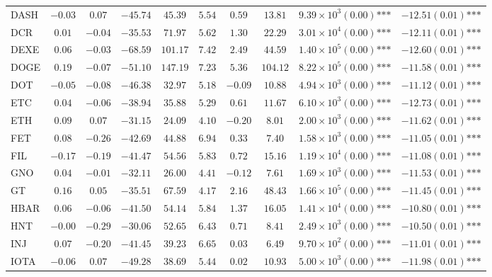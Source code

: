 \documentclass{article}
\begin{document}
\begin{table}[htbp]
\begin{adjustbox}{width=\textwidth}
\begin{tabular}{lccccccccc}
DASH & $-0.03$ & $0.07$ & $-45.74$ & $45.39$ & $5.54$ & $0.59$ & $13.81$ & $9.39\times 10^{3}(0.00)\text{***}$ & $-12.51(0.01)\text{***}$ \\
DCR & $0.01$ & $-0.04$ & $-35.53$ & $71.97$ & $5.62$ & $1.30$ & $22.29$ & $3.01\times 10^{4}(0.00)\text{***}$ & $-12.11(0.01)\text{***}$ \\
DEXE & $0.06$ & $-0.03$ & $-68.59$ & $101.17$ & $7.42$ & $2.49$ & $44.59$ & $1.40\times 10^{5}(0.00)\text{***}$ & $-12.60(0.01)\text{***}$ \\
DOGE & $0.19$ & $-0.07$ & $-51.10$ & $147.19$ & $7.23$ & $5.36$ & $104.12$ & $8.22\times 10^{5}(0.00)\text{***}$ & $-11.58(0.01)\text{***}$ \\
DOT & $-0.05$ & $-0.08$ & $-46.38$ & $32.97$ & $5.18$ & $-0.09$ & $10.88$ & $4.94\times 10^{3}(0.00)\text{***}$ & $-11.12(0.01)\text{***}$ \\
ETC & $0.04$ & $-0.06$ & $-38.94$ & $35.88$ & $5.29$ & $0.61$ & $11.67$ & $6.10\times 10^{3}(0.00)\text{***}$ & $-12.73(0.01)\text{***}$ \\
ETH & $0.09$ & $0.07$ & $-31.15$ & $24.09$ & $4.10$ & $-0.20$ & $8.01$ & $2.00\times 10^{3}(0.00)\text{***}$ & $-11.62(0.01)\text{***}$ \\
FET & $0.08$ & $-0.26$ & $-42.69$ & $44.88$ & $6.94$ & $0.33$ & $7.40$ & $1.58\times 10^{3}(0.00)\text{***}$ & $-11.05(0.01)\text{***}$ \\
FIL & $-0.17$ & $-0.19$ & $-41.47$ & $54.56$ & $5.83$ & $0.72$ & $15.16$ & $1.19\times 10^{4}(0.00)\text{***}$ & $-11.08(0.01)\text{***}$ \\
GNO & $0.04$ & $-0.01$ & $-32.11$ & $26.00$ & $4.41$ & $-0.12$ & $7.61$ & $1.69\times 10^{3}(0.00)\text{***}$ & $-11.53(0.01)\text{***}$ \\
GT & $0.16$ & $0.05$ & $-35.51$ & $67.59$ & $4.17$ & $2.16$ & $48.43$ & $1.66\times 10^{5}(0.00)\text{***}$ & $-11.45(0.01)\text{***}$ \\
HBAR & $0.06$ & $-0.06$ & $-41.50$ & $54.14$ & $5.84$ & $1.37$ & $16.05$ & $1.41\times 10^{4}(0.00)\text{***}$ & $-10.80(0.01)\text{***}$ \\
HNT & $-0.00$ & $-0.29$ & $-30.06$ & $52.65$ & $6.43$ & $0.71$ & $8.41$ & $2.49\times 10^{3}(0.00)\text{***}$ & $-10.50(0.01)\text{***}$ \\
INJ & $0.07$ & $-0.20$ & $-41.45$ & $39.23$ & $6.65$ & $0.03$ & $6.49$ & $9.70\times 10^{2}(0.00)\text{***}$ & $-11.01(0.01)\text{***}$ \\
IOTA & $-0.06$ & $0.07$ & $-49.28$ & $38.69$ & $5.44$ & $0.02$ & $10.93$ & $5.00\times 10^{3}(0.00)\text{***}$ & $-11.98(0.01)\text{***}$ \\

\end{tabular}
\end{adjustbox}
\end{table}
\end{document}
